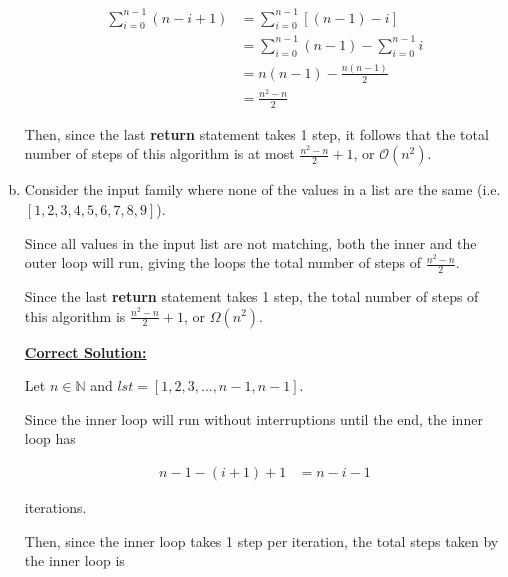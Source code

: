 \documentclass[12pt]{article}
\begin{document}
\begin{enumerate}[a.]
\begin{tcolorbox}
        \begin{align}
            \sum\limits_{i=0}^{n-1} (n - i + 1) &= \sum\limits_{i=0}^{n-1} \left[ (n-1) - i \right]\\
            &= \sum\limits_{i=0}^{n-1} (n-1) - \sum\limits_{i=0}^{n-1} i\\
            &= n(n-1) - \frac{n(n-1)}{2}\\
            &= \frac{n^2-n}{2}
        \end{align}

        \bigskip

        Then, since the last \textbf{return} statement takes 1 step, it follows
        that the total number of steps of this algorithm is at most
        $\frac{n^2-n}{2} + 1$, or $\mathcal{O}(n^2)$.
    \end{tcolorbox}

    \item

    Consider the input family where none of the values in a list are the same
    (i.e. $[1,2,3,4,5,6,7,8,9]$).

    \bigskip

    Since all values in the input list are not matching, both the inner and
    the outer loop will run, giving the loops the total number of steps
    of $\frac{n^2-n}{2}$.

    \bigskip

    Since the last \textbf{return} statement takes 1 step, the total number of
    steps of this algorithm is $\frac{n^2-n}{2} + 1$, or $\Omega(n^2)$.

    \begin{tcolorbox}
        \underline{\textbf{Correct Solution:}}

        \bigskip

        Let $n \in \mathbb{N}$ and $lst = [1,2,3,\dots,n-1,n-1]$.

        \bigskip

        Since the inner loop will run without interruptions until the end, the
        inner loop has

        \setcounter{equation}{0}
        \begin{align}
            n-1-(i+1) + 1 &= n-i-1
        \end{align}

        iterations.

        \bigskip

        Then, since the inner loop takes 1 step per iteration, the total steps
        taken by the inner loop is


\end{tcolorbox}
\end{enumerate}
\end{document}
